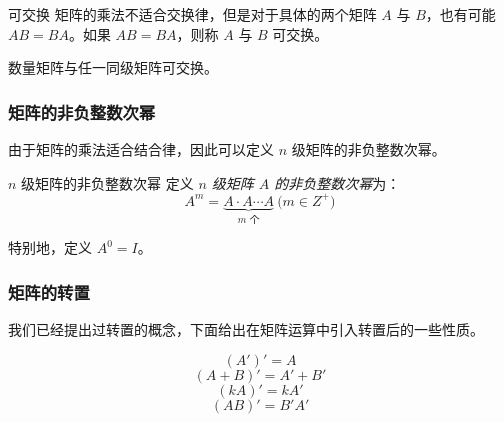 \begin{definition}{可交换}
	矩阵的乘法不适合交换律，但是对于具体的两个矩阵 $A$ 与 $B$，也有可能 $AB = BA$。如果 $AB = BA$，则称 $A$ 与 $B$ 可交换。
\end{definition}

\begin{theorem}
	数量矩阵与任一同级矩阵可交换。
\end{theorem}

\subsubsection{矩阵的非负整数次幂}

由于矩阵的乘法适合结合律，因此可以定义 $n$ 级矩阵的非负整数次幂。

\begin{definition}{$n$ 级矩阵的非负整数次幂}
	定义 \emph{$n$ 级矩阵 $A$ 的非负整数次幂}为：
	$$
	A^m = \underset{\text{$m$ 个}}{\underbrace{A \cdot A \cdots A}} \pod{m \in Z^+}
	$$

	特别地，定义 $A^0 = I$。
\end{definition}

\subsubsection{矩阵的转置}

我们已经提出过转置的概念，下面给出在矩阵运算中引入转置后的一些性质。

\begin{theorem}
	$$
	(A')' = A
	$$$$
	(A + B)' = A' + B'
	$$$$
	(kA)' = kA'
	$$$$
	(AB)' = B'A'
	$$
\end{theorem}